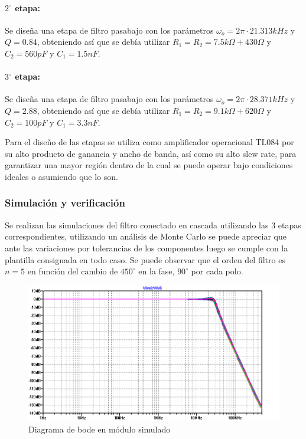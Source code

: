 \paragraph{$2^{\circ}$ etapa:} Se dise\~na una etapa de filtro pasabajo con los par\'ametros $\omega_o = 2 \pi \cdot 21.313kHz$ y $Q = 0.84$, obteniendo as\'i que se deb\'ia utilizar $R_1 = R_2 = 7.5k\Omega + 430 \Omega$ y $C_2 = 560pF$ y $C_1 = 1.5nF$.
\paragraph{$3^{\circ}$ etapa:} Se dise\~na una etapa de filtro pasabajo con los par\'ametros $\omega_o = 2 \pi \cdot 28.371kHz$ y $Q = 2.88$, obteniendo as\'i que se deb\'ia utilizar $R_1 = R_2 = 9.1k\Omega + 620 \Omega$ y $C_2 = 100pF$ y $C_1 = 3.3nF$.

Para el dise\~no de las etapas se utiliza como amplificador operacional TL084 por su alto producto de ganancia y ancho de banda, as\'i como su alto slew rate, para garantizar una mayor regi\'on dentro de la cual se puede operar bajo condiciones ideales o asumiendo que lo son.

\subsubsection{Simulaci\'on y verificaci\'on}
Se realizan las simulaciones del filtro conectado en cascada utilizando las 3 etapas correspondientes, utilizando un an\'alisis de Monte Carlo se puede apreciar que ante las variaciones por tolerancias
de los componentes luego se cumple con la plantilla consignada en todo caso. Se puede observar que el orden del filtro es $n = 5$ en funci\'on del cambio de $450^{\circ}$ en la fase, $90^{\circ}$ por cada polo.

\begin{figure}[H]
    \centering
    \includegraphics[scale=0.6]{../EJ1/Recursos/legendre_verificacion_magnitud.png}
    \caption{Diagrama de bode en m\'odulo simulado}
\end{figure}

